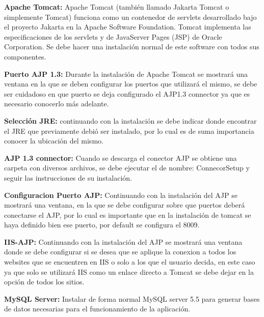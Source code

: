 \textbf{Apache Tomcat:} Apache Tomcat (también llamado Jakarta Tomcat o simplemente Tomcat) funciona como un contenedor de servlets desarrollado bajo el proyecto Jakarta en la Apache Software Foundation. Tomcat implementa las especificaciones de los servlets y de JavaServer Pages (JSP) de Oracle Corporation. Se debe hacer una instalación normal de este software con todos sus componentes.


\newpage

\textbf{Puerto AJP 1.3:} Durante la instalación de Apache Tomcat se mostrará una ventana en la que se deben configurar los puertos que utilizará el mismo, se debe ser cuidadoso en que puerto se deja configurado el AJP1.3 connector ya que es necesario conocerlo más adelante.


\newpage

\textbf{Selección JRE:} continuando con la instalación se debe indicar donde encontrar el JRE que previamente debió ser instalado, por lo cual es de suma importancia conocer la ubicación del mismo.


\newpage

\textbf{AJP 1.3 connector:} Cuando se descarga el conector AJP se obtiene una carpeta con diversos archivos, se debe ejecutar el de nombre: ConnecorSetup y seguir las instrucciones de su instalación.


\newpage

\textbf{Configuracion Puerto AJP:} Continuando con la instalación del AJP se mostrará una ventana, en la que se debe configurar sobre que puertos deberá conectarse el AJP, por lo cual es importante que en la instalación de tomcat se haya definido bien ese puerto, por default se configura el 8009.


\newpage

\textbf{IIS-AJP:} Continuando con la instalación del AJP se mostrará una ventana donde se debe configurar si se desea que se aplique la conexion a todos los websites que se encuentren en IIS o solo a los que el usuario decida, en este caso ya que solo se utilizará IIS como un enlace directo a Tomcat se debe dejar en la opción de todos los sitios.


\newpage

\textbf{MySQL Server:} Instalar de forma normal MySQL server 5.5 para generar bases de datos necesarias para el funcionamiento de la aplicación.


